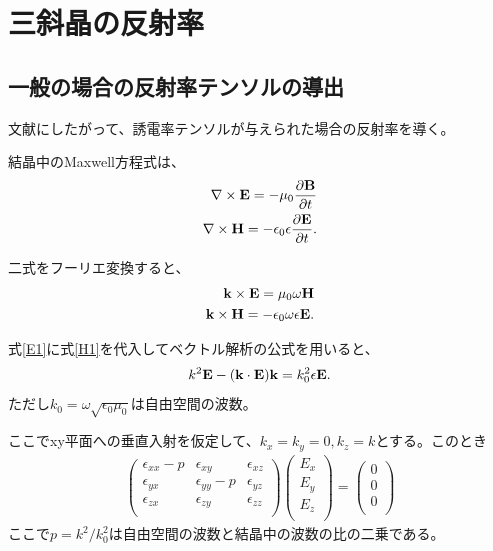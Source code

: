 \documentclass[11pt,a4paper]{jsarticle}
\begin{document}
\section{三斜晶の反射率}
\subsection{一般の場合の反射率テンソルの導出}
文献\cite{dielectric_tensor_triclinic}にしたがって、誘電率テンソルが与えられた場合の反射率を導く。

結晶中のMaxwell方程式は、
\begin{eqnarray}
\nabla \times {\bf E} = -\mu_0 \frac{\partial \bf B}{\partial t}\\
\nabla \times {\bf H} = -\epsilon_0 \epsilon  \frac{\partial \bf E}{ \partial t}.
\end{eqnarray}

二式をフーリエ変換すると、
\begin{eqnarray}
\label{E1}
{\bf k} \times {\bf E} = \mu_0 \omega {\bf H}\\
\label{H1}
{\bf k} \times {\bf H} = -\epsilon_0 \omega  \epsilon  {\bf E}.
\end{eqnarray}

式\ref{E1}に式\ref{H1}を代入してベクトル解析の公式を用いると、
\begin{eqnarray}
k^2 {\bf E} - ( {\bf k} \cdot {\bf E} ) {\bf k}=  k_0^2  \epsilon {\bf E}.
\end{eqnarray}
ただし$k_0=\omega \sqrt{\epsilon_0 \mu_0}$は自由空間の波数。

ここでxy平面への垂直入射を仮定して、$k_x=k_y=0, k_z=k$とする。このとき
\begin{eqnarray}
\left(
    \begin{array}{ccc}
      \epsilon_{xx}-p & \epsilon_{xy} & \epsilon_{xz} \\
      \epsilon_{yx} &  \epsilon_{yy} -p & \epsilon_{yz} \\
      \epsilon_{zx} & \epsilon_{zy} & \epsilon_{zz} \\
    \end{array}
\right)
\left( \begin{array}{c} E_x\\ E_y\\ E_z \\ \end{array} \right)
=\left( \begin{array}{c} 0\\ 0\\ 0 \\ \end{array} \right)
\end{eqnarray}
ここで$p=k^2/k_0^2$は自由空間の波数と結晶中の波数の比の二乗である。
\end{document}
